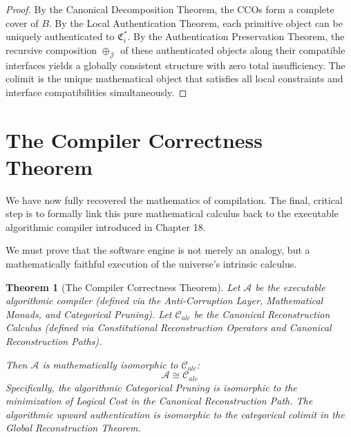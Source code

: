 \documentclass[12pt,openany]{extbook}
\theoremstyle{plain}
\newtheorem{theorem}{Theorem}[chapter]
\theoremstyle{definition}
\begin{document}
\begin{proof}
By the Canonical Decomposition Theorem, the CCOs form a complete cover of $B$. By the Local Authentication Theorem, each primitive object can be uniquely authenticated to $\mathfrak{C}_i^*$. By the Authentication Preservation Theorem, the recursive composition $\oplus_{\mathcal{J}}$ of these authenticated objects along their compatible interfaces yields a globally consistent structure with zero total insufficiency. The colimit is the unique mathematical object that satisfies all local constraints and interface compatibilities simultaneously.
\end{proof}

\section{The Compiler Correctness Theorem}

We have now fully recovered the mathematics of compilation. The final, critical step is to formally link this pure mathematical calculus back to the executable algorithmic compiler introduced in Chapter 18. 

We must prove that the software engine is not merely an analogy, but a mathematically faithful execution of the universe's intrinsic calculus.

\begin{theorem}[The Compiler Correctness Theorem]
Let $\mathcal{A}$ be the executable algorithmic compiler (defined via the Anti-Corruption Layer, Mathematical Monads, and Categorical Pruning). Let $\mathcal{C}_{alc}$ be the Canonical Reconstruction Calculus (defined via Constitutional Reconstruction Operators and Canonical Reconstruction Paths).

Then $\mathcal{A}$ is mathematically isomorphic to $\mathcal{C}_{alc}$:
\[
\mathcal{A} \cong \mathcal{C}_{alc}
\]
Specifically, the algorithmic Categorical Pruning is isomorphic to the minimization of Logical Cost in the Canonical Reconstruction Path. The algorithmic upward authentication is isomorphic to the categorical colimit in the Global Reconstruction Theorem.
\end{theorem}
\end{document}
